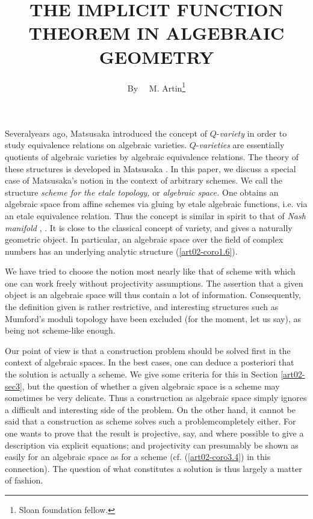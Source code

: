 \title{THE IMPLICIT FUNCTION THEOREM IN ALGEBRAIC GEOMETRY}

\author{By~~ M. Artin\footnote{Sloan foundation fellow.}}

\date{}

\maketitle

\setcounter{pageoriginal}{12}
Several\pageoriginale years ago, Matsusaka introduced the concept of $Q$-{\em variety} in order to study equivalence relations on algebraic varieties. $Q$-{\em varieties} are essentially quotients of algebraic varieties by algebraic equivalence relations. The theory of these structures is developed in Matsusaka \cite{art02-key24}. In this paper, we discuss a special case of Matsusaka's notion in the context of arbitrary schemes. We call the structure {\em scheme for the etale topology,} or {\em algebraic space.} One obtains an algebraic space from affine schemes via gluing by etale algebraic functions, i.e. via an etale equivalence relation. Thus the concept is similar in spirit to that of {\em Nash manifold} \cite{art02-key29}, \cite{art02-key5}. It is close to the classical concept of variety, and gives a naturally geometric object. In particular, an algebraic space over the field of complex numbers has an underlying analytic structure (\ref{art02-coro1.6}).

We have tried to choose the notion most nearly like that of scheme with which one can work freely without projectivity assumptions. The assertion that a given object is an algebraic space will thus contain a lot of information. Consequently, the definition given is rather restrictive, and interesting structures such as Mumford's moduli topology \cite{art02-key26} have been excluded (for the moment, let us say), as being not scheme-like enough.

Our point of view is that a construction problem should be solved first in the context of algebraic spaces. In the best cases, one can deduce a posteriori that the solution is actually a scheme. We give some criteria for this in Section \ref{art02-sec3}, but the question of whether a given algebraic space is a scheme may sometimes be very delicate. Thus a construction as algebraic space simply ignores a difficult and interesting side of the problem. On the other hand, it cannot be said that a construction as scheme solves such a problem\pageoriginale completely either. For one wants to prove that the result is projective, say, and where possible to give a description via explicit equations; and projectivity can presumably be shown as easily for an algebraic space as for a scheme (cf. (\ref{art02-coro3.4}) in this connection). The question of what constitutes a solution is thus largely a matter of fashion.

